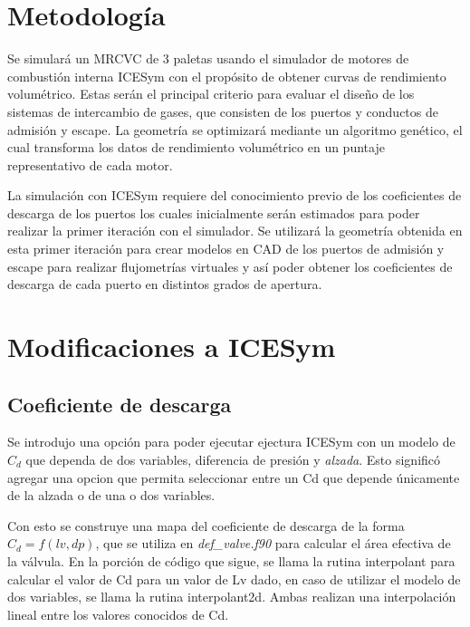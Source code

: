 \section{Metodología}
%
Se simulará un MRCVC de 3 paletas usando el simulador de motores de combustión
interna ICESym \cite{icesym} con el propósito de obtener curvas de rendimiento
volumétrico.
%
Estas serán el principal criterio para evaluar el diseño de los sistemas de
intercambio de gases, que consisten de los puertos y conductos de admisión y
escape.
%
La geometría se optimizará mediante un algoritmo genético, el cual transforma
los datos de rendimiento volumétrico en un puntaje representativo de cada
motor.


La simulación con ICESym requiere del conocimiento previo de los coeficientes
de descarga de los puertos los cuales inicialmente serán estimados para poder
realizar la primer iteración con el simulador.
%
Se utilizará la geometría obtenida en esta primer iteración para crear modelos
en CAD de los puertos de admisión y escape para realizar flujometrías virtuales
y así poder obtener los coeficientes de descarga de cada puerto en distintos
grados de apertura.


\section{Modificaciones a ICESym} \subsection{Coeficiente de descarga}
%
Se introdujo una opción para poder ejecutar ejectura ICESym con un modelo de
$C_d$ que dependa de dos variables, diferencia de presión y \emph{alzada}.
%
Esto significó agregar una opcion que permita seleccionar entre un Cd que
depende únicamente de la alzada o de una o dos variables.

Con esto se construye una mapa del coeficiente de descarga de la forma $C_d =
f(lv, dp)$, que se utiliza en \emph{def\_valve.f90} para calcular el área
efectiva de la válvula.
%
En la porción de código que sigue, se llama la rutina interpolant para calcular
el valor de Cd para un valor de Lv dado, en caso de utilizar el modelo de dos
variables, se llama la rutina interpolant2d.
%
Ambas realizan una interpolación lineal entre los valores conocidos de Cd.


